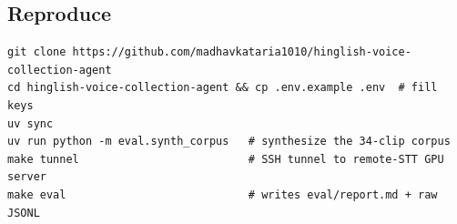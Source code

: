 \documentclass[11pt,a4paper]{article}
\begin{document}
\subsection*{Reproduce}

\begin{lstlisting}
git clone https://github.com/madhavkataria1010/hinglish-voice-collection-agent
cd hinglish-voice-collection-agent && cp .env.example .env  # fill keys
uv sync
uv run python -m eval.synth_corpus   # synthesize the 34-clip corpus
make tunnel                          # SSH tunnel to remote-STT GPU server
make eval                            # writes eval/report.md + raw JSONL
\end{lstlisting}
\end{document}
